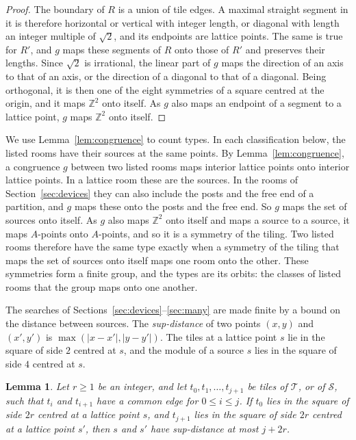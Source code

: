 \documentclass[11pt,a4paper]{article}
\theoremstyle{plain}
\newtheorem{lemma}[theorem]{Lemma}
\theoremstyle{definition}
\theoremstyle{remark}
\newcommand{\Z}{\mathbb{Z}}
\newcommand{\T}{\mathcal{T}}
\newcommand{\Sq}{\mathcal{S}}
\numberwithin{equation}{section}
\begin{document}
\begin{proof}
The boundary of $R$ is a union of tile edges. A maximal straight segment in it is therefore horizontal or vertical with integer length, or diagonal with length an integer multiple of $\sqrt2$, and its endpoints are lattice points. The same is true for $R'$, and $g$ maps these segments of $R$ onto those of $R'$ and preserves their lengths. Since $\sqrt2$ is irrational, the linear part of $g$ maps the direction of an axis to that of an axis, or the direction of a diagonal to that of a diagonal. Being orthogonal, it is then one of the eight symmetries of a square centred at the origin, and it maps $\Z^2$ onto itself. As $g$ also maps an endpoint of a segment to a lattice point, $g$ maps $\Z^2$ onto itself.
\end{proof}

We use Lemma~\ref{lem:congruence} to count types. In each classification below, the listed rooms have their sources at the same points. By Lemma~\ref{lem:congruence}, a congruence $g$ between two listed rooms maps interior lattice points onto interior lattice points. In a lattice room these are the sources. In the rooms of Section~\ref{sec:devices} they can also include the posts and the free end of a partition, and $g$ maps these onto the posts and the free end. So $g$ maps the set of sources onto itself. As $g$ also maps $\Z^2$ onto itself and maps a source to a source, it maps $A$-points onto $A$-points, and so it is a symmetry of the tiling. Two listed rooms therefore have the same type exactly when a symmetry of the tiling that maps the set of sources onto itself maps one room onto the other. These symmetries form a finite group, and the types are its orbits: the classes of listed rooms that the group maps onto one another.

The searches of Sections~\ref{sec:devices}--\ref{sec:many} are made finite by a bound on the distance between sources. The \emph{sup-distance} of two points $(x,y)$ and $(x',y')$ is $\max(|x-x'|,|y-y'|)$. The tiles at a lattice point $s$ lie in the square of side $2$ centred at $s$, and the module of a source $s$ lies in the square of side $4$ centred at $s$.

\begin{lemma}\label{lem:chain}
Let $r\ge1$ be an integer, and let $t_0,t_1,\dots,t_{j+1}$ be tiles of $\T$, or of $\Sq$, such that $t_i$ and $t_{i+1}$ have a common edge for $0\le i\le j$. If $t_0$ lies in the square of side $2r$ centred at a lattice point $s$, and $t_{j+1}$ lies in the square of side $2r$ centred at a lattice point $s'$, then $s$ and $s'$ have sup-distance at most $j+2r$.
\end{lemma}
\end{document}
